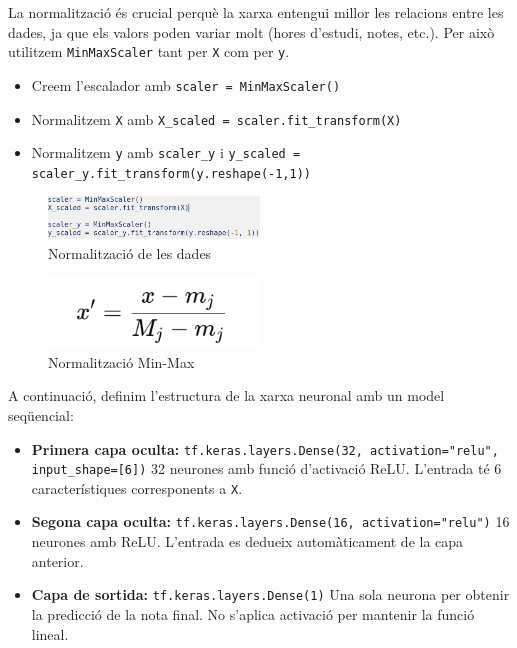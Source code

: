 La normalització és crucial perquè la xarxa entengui millor les relacions entre les dades, ja que els valors poden variar molt (hores d’estudi, notes, etc.). Per això utilitzem \texttt{MinMaxScaler} tant per \texttt{X} com per \texttt{y}.

\begin{itemize}
\item Creem l’escalador amb \texttt{scaler = MinMaxScaler()}
\item Normalitzem \texttt{X} amb \texttt{X\_scaled = scaler.fit\_transform(X)}
\item Normalitzem \texttt{y} amb \texttt{scaler\_y} i \texttt{y\_scaled = scaler\_y.fit\_transform(y.reshape(-1,1))}
\end{itemize}

\begin{figure}[H]
\centering
\includegraphics[width=0.5\textwidth]{./figures/24.png}
\caption{Normalització de les dades}
\end{figure}

\begin{figure}[H]
\centering
\includegraphics[width=0.5\textwidth]{./figures/25.png}
\caption{Normalització Min-Max}
\end{figure}

A continuació, definim l’estructura de la xarxa neuronal amb un model seqüencial:

\begin{itemize}
\item \textbf{Primera capa oculta:} \texttt{tf.keras.layers.Dense(32, activation="relu", input\_shape=[6])}
32 neurones amb funció d’activació ReLU. L’entrada té 6 característiques corresponents a \texttt{X}.
\item \textbf{Segona capa oculta:} \texttt{tf.keras.layers.Dense(16, activation="relu")}
16 neurones amb ReLU. L’entrada es dedueix automàticament de la capa anterior.

\item \textbf{Capa de sortida:} \texttt{tf.keras.layers.Dense(1)}
Una sola neurona per obtenir la predicció de la nota final. No s’aplica activació per mantenir la funció lineal.
\end{itemize}

